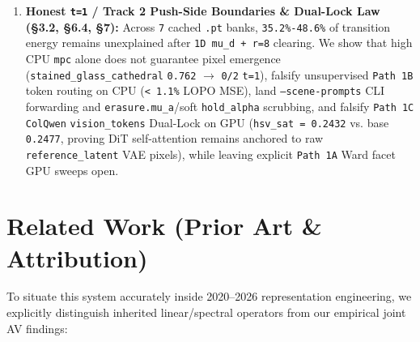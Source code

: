 \documentclass[10pt]{article}
\begin{document}
\begin{enumerate}[leftmargin=*]
\item \textbf{Honest \texttt{t=1} / Track 2 Push-Side Boundaries \& Dual-Lock Law (\S{}3.2, \S{}6.4, \S{}7):} Across \texttt{7} cached \texttt{.pt} banks, \texttt{35.2\%-48.6\%} of transition energy remains unexplained after \texttt{1D mu\_d + r=8} clearing. We show that high CPU \texttt{mpc} alone does not guarantee pixel emergence (\texttt{stained\_glass\_cathedral} \texttt{0.762} $\to$ \texttt{0/2} \texttt{t=1}), falsify unsupervised \texttt{Path 1B} token routing on CPU (\texttt{< 1.1\%} LOPO MSE), land \texttt{--scene-prompts} CLI forwarding and \texttt{erasure.mu\_a}/soft \texttt{hold\_alpha} scrubbing, and falsify \texttt{Path 1C} \texttt{ColQwen} \texttt{vision\_tokens} Dual-Lock on GPU (\texttt{hsv\_sat = 0.2432} vs. base \texttt{0.2477}, proving DiT self-attention remains anchored to raw \texttt{reference\_latent} VAE pixels), while leaving explicit \texttt{Path 1A} Ward facet GPU sweeps open.
\end{enumerate}


\section{Related Work (Prior Art \& Attribution)}

To situate this system accurately inside 2020--2026 representation engineering, we explicitly distinguish inherited linear/spectral operators from our empirical joint AV findings:
\end{document}

